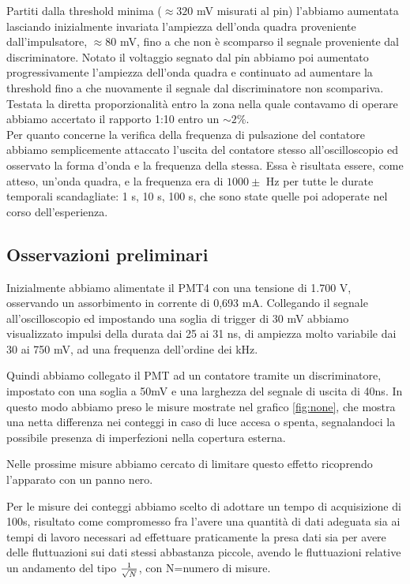 \documentclass[a4paper,10pt]{article}
\begin{document}
Partiti dalla threshold minima ($\approx320$ mV misurati al pin) l'abbiamo aumentata lasciando inizialmente invariata l'ampiezza dell'onda quadra proveniente dall'impulsatore, $\approx80$ mV, fino a che non è scomparso il segnale proveniente dal discriminatore. Notato il voltaggio segnato dal pin abbiamo poi aumentato progressivamente l'ampiezza dell'onda quadra e continuato ad aumentare la threshold fino a che nuovamente il segnale dal discriminatore non scompariva. Testata la diretta proporzionalità entro la zona nella quale contavamo di operare abbiamo accertato il rapporto 1:10 entro un $\sim2\%$.
\\Per quanto concerne la verifica della frequenza di pulsazione del contatore abbiamo semplicemente attaccato l'uscita del contatore stesso all'oscilloscopio ed osservato la forma d'onda e la frequenza della stessa. Essa è risultata essere, come atteso, un'onda quadra, e la frequenza era di $1000\pm$ Hz per tutte le durate temporali scandagliate: 1 s, 10 s, 100 s, che sono state quelle poi adoperate nel corso dell'esperienza.

\subsection{Osservazioni preliminari}
Inizialmente abbiamo alimentate il PMT4 con una tensione di 1.700 V, osservando un assorbimento in corrente di 0,693 mA. Collegando il segnale all'oscilloscopio ed impostando una soglia di trigger di 30 mV abbiamo visualizzato impulsi della durata dai 25 ai 31 ns, di ampiezza molto variabile dai 30 ai 750 mV, ad una frequenza dell'ordine dei kHz.


Quindi abbiamo collegato il PMT ad un contatore tramite un discriminatore, impostato con una soglia a 50mV e una larghezza del segnale di uscita di 40ns. In questo modo abbiamo preso le misure mostrate nel grafico \ref{fig:none}, che mostra una netta differenza nei conteggi in caso di luce accesa o spenta, segnalandoci la possibile presenza di imperfezioni nella copertura esterna.


Nelle prossime misure abbiamo cercato di limitare questo effetto ricoprendo l'apparato con un panno nero.


Per le misure dei conteggi abbiamo scelto di adottare un tempo di acquisizione di 100s, risultato come compromesso fra l'avere una quantità di dati adeguata sia ai tempi di lavoro necessari ad effettuare praticamente la presa dati sia per avere delle fluttuazioni sui dati stessi abbastanza piccole, avendo le fluttuazioni relative un andamento del tipo $1\over{\sqrt{N}}$, con N=numero di misure.
\end{document}
